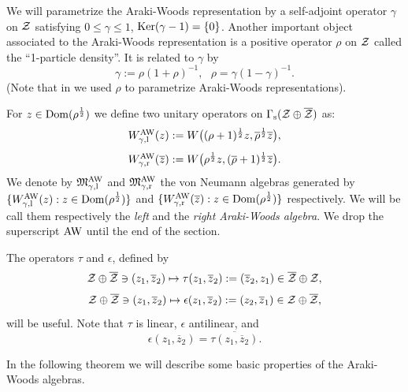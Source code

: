\documentclass{svmult}
\newcommand{\beq}{\begin{equation}}
\newcommand{\eeq}{\end{equation}}
\def\AW{{\rm AW}}
\def\bar{\overline}
\def\l{{\rm l}}
\def\r{{\rm r}}
\def\s{{\rm s}}
\def\12{{\frac12}}
\def\AW{{\rm AW}}
\def\cZ{{\cal Z}}
\def\fM{{\mathfrak M}}
\def\Dom{{\rm Dom}}
\def\Ker{{\rm Ker}}
\def\12{\frac{1}{2}}
\def\l{{\rm l}}
\def\r{{\rm r}}
\def\Ker{{\rm Ker}}
\def\12{\frac{1}{2}}
\def\s{{\rm s}}
\begin{document}
We will parametrize the Araki-Woods representation by a self-adjoint
 operator $\gamma $ on
$\cZ$ satisfying   $0\leq\gamma\leq1$, $\Ker(\gamma-1)=\{0\}$. 
Another important object associated to the Araki-Woods representation is a
positive operator $\rho$ on $\cZ$ called the
``1-particle density''. It   is related to $\gamma$ by
\beq
\gamma:=\rho(1+\rho)^{-1},  \ \ \ \rho=\gamma(1-\gamma)^{-1}.\label{casz}
\eeq
(Note  that in 
\cite{DJ2} we used $\rho$ to parametrize Araki-Woods representations).


 For $z\in  \Dom(\rho^\12)$ we define two unitary operators  on
 $\Gamma_\s(\cZ\oplus\bar\cZ)$ as:
\[\begin{array}{l}
 W_{\gamma,\l}^\AW(z):=W\bigl((\rho+1)^{\12}z,\bar\rho^{\12}
\bar z\bigr),\\[3mm]
 W_{\gamma,\r}^\AW(\bar z):=W\bigl(\rho^{\12}z,(\bar\rho+1)^{\12}
\bar z\bigr).\end{array}\]
We denote by $\fM_{\gamma,\l}^\AW$ and $\fM_{\gamma,\r}^\AW$ 
the von Neumann algebras
generated by $\{W_{\gamma,\l}^\AW(z) : z\in \Dom(\rho^\12)\}$ and  
$\{W_{\gamma,\r}^\AW(\bar z) : z\in \Dom(\rho^\12)\}$ respectively.
We  will be call them respectively the {\em 
left} and the {\em right  Araki-Woods algebra}.
We  drop the superscript 
${\AW}$ until the end of the section.

The operators
$\tau$ and $\epsilon$, 
defined by 
\begin{equation}\cZ\oplus\bar\cZ\ni(z_1,\bar{z}_2)\mapsto
\tau(z_1,\bar{z}_2):=(\bar{z}_2,z_1)
\in \bar\cZ\oplus\cZ,\label{tau}\end{equation}
\begin{equation}\cZ\oplus\bar\cZ\ni(z_1,\bar{z}_2)\mapsto
\epsilon(z_1,\bar{z}_2):=(z_2,\bar{z}_1)
\in \cZ\oplus\bar\cZ,\label{epsi}\end{equation}
will be useful.
Note that $\tau$ is linear, $\epsilon$ antilinear, and
\begin{equation} \epsilon(z_1,\bar{z}_2)=\bar{\tau(z_1,\bar{z}_2)}.\end{equation}



In the following theorem  we will describe some basic 
properties of the Araki-Woods algebras.  
\end{document}
